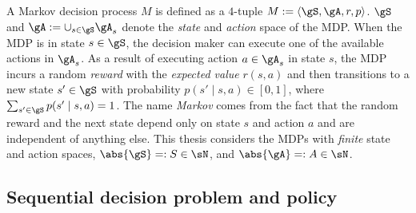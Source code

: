 A Markov decision process $M$ is defined as a $4$-tuple $M:=\langle\gS, \gA, r, p\rangle$.
$\gS$ and $\gA:=\cup_{s\in\gS}\gA_s$ denote the \emph{state} and \emph{action} space of the MDP.
When the MDP is in state $s\in\gS$, the decision maker can execute one of the available actions in $\gA_s$.
As a result of executing action $a\in\gA_s$ in state $s$, the MDP incurs a random \emph{reward} with the \emph{expected value} $r(s,a)$ and then transitions to a new state $s'\in\gS$ with probability $p(s'\mid s, a)\in[0,1]$, where $\sum_{s'\in\gS}p(s'\mid s,a)=1$.
The name \emph{Markov} comes from the fact that the random reward and the next state depend only on state $s$ and action $a$ and are independent of anything else.
This thesis considers the MDPs with \emph{finite} state and action spaces, $\abs{\gS}=:S\in\sN$, and $\abs{\gA}=:A\in\sN$.


\subsection{Sequential decision problem and policy}

